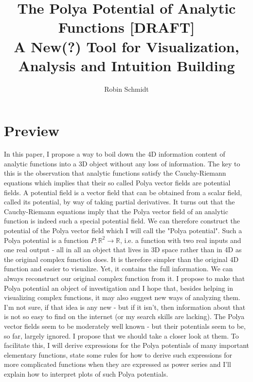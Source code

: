 \documentclass[12pt]{article}
\begin{document}
\parindent=0in
\parskip=0pt

 \setcounter{page}{1}

\title{The Polya Potential of Analytic Functions [DRAFT]\\ {\Large A New(?) Tool for Visualization, Analysis and Intuition Building}}
\author{Robin Schmidt}
\maketitle


\section{Preview}
In this paper, I propose a way to boil down the 4D information content of analytic functions into a 3D object without any loss of information. The key to this is the observation that analytic functions satisfy the Cauchy-Riemann equations which implies that their so called Polya vector fields are potential fields. A potential field is a vector field that can be obtained from a scalar field, called its potential, by way of taking partial derivatives. It turns out that the Cauchy-Riemann equations imply that the Polya vector field of an analytic function is indeed such a special potential field. We can therefore construct the potential of the Polya vector field which I will call the "Polya potential". Such a Polya potential is a function $P: \mathbb{R}^2 \rightarrow \mathbb{R}$, i.e. a function with two real inputs and one real output - all in all an object that lives in 3D space rather than in 4D as the original complex function does. It is therefore simpler than the original 4D function and easier to visualize. Yet, it contains the full information. We can always reconstruct our original complex function from it. I propose to make that Polya potential an object of investigation and I hope that, besides helping in visualizing complex functions, it may also suggest new ways of analyzing them. I'm not sure, if that idea is any new - but if it isn't, then information about that is not so easy to find on the internet (or my search skills are lacking). The Polya vector fields seem to be moderately well known - but their potentials seem to be, so far, largely ignored. I propose that we should take a closer look at them. To facilitate this, I will derive expressions for the Polya potentials of many important elementary functions, state some rules for how to derive such expressions for more complicated functions when they are expressed as power series and I'll explain how to interpret plots of such Polya potentials. 
\end{document}
